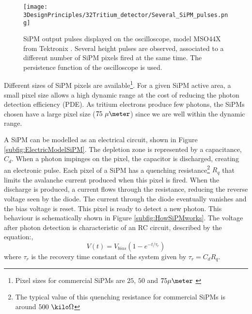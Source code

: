 \begin{figure}[h]
\centering
\texttt{[image: 3DesignPrinciples/32Tritium\_detector/Several\_SiPM\_pulses.png]}
\caption{SiPM output pulses displayed on the oscilloscope, model MSO44X from Tektronix \cite{Oscilloscope}. Several height pulses are observed, associated to a different number of  SiPM pixels fired at the same time. The persistence function of the oscilloscope is used.\label{fig:PulsesOfSiPM}}
\end{figure}

Different sizes of SiPM pixels are available\footnote{Pixel sizes for commercial SiPMs are $25$, $50$ and $75\mu\meter$ \cite{DataSheetHammamatsu_1_SiPM_25, DataSheetHammamatsu_1_SiPM_50, DataSheetHammamatsu_1_SiPM_75}}. For a given SiPM active area, a small pixel size allows a high dynamic range at the cost of reducing the photon detection efficiency (PDE). As tritium electrons produce few photons, the SiPMs chosen have a large pixel size ($75~\mu\meter$) since we are well within the dynamic range.


A SiPM can be modelled as an electrical circuit, shown in Figure \ref{subfig:ElectricModelSiPM}. The depletion zone is represented by a capacitance, $C_d$. When a photon impinges on the pixel, the capacitor is discharged, creating an electronic pulse. Each pixel of a SiPM has a quenching resistance\footnote{The typical value of this quenching resistance for commercial SiPMs is around $500~\kilo\Omega$} $R_q$ that limits the avalanche current produced when this pixel is fired. When the discharge is produced, a current flows through the resistance, reducing the reverse voltage seen by the diode. The current through the diode eventually vanishes and the bias voltage is reset. This pixel is ready to detect a new photon. This behaviour is schematically shown in Figure \ref{subfig:HowSiPMworks}. The voltage after photon detection is characteristic of an RC circuit, described by the equation:,
\begin{equation}
V(t)=V_{bias}\left(1-e^{-t/\tau_r} \right)
\label{RCCircuitBiasVoltage}
\end{equation}
where $\tau_r$ is the recovery time constant of the system given by $\tau_r=C_d R_q$.

